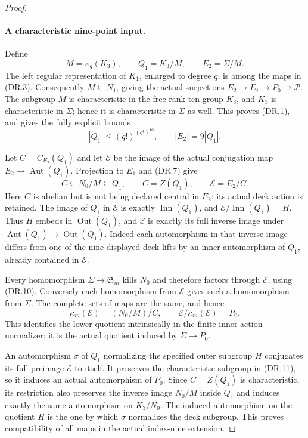 \begin{proof}
\paragraph{A characteristic nine-point input.}
Define
\[
 M=\kappa_q(K_3),\qquad Q_1=K_3/M,
 \qquad E_2=\Sigma/M.                                 \tag{DR.8}
\]
The left regular representation of $K_1$, enlarged to
degree $q$, is among the maps in (DR.3).
Consequently $M\subseteq N_1$, giving the actual
surjections $E_2\to E_1\to P_0\to\mathcal P$.
The subgroup $M$ is characteristic in the free rank-ten
group $K_3$, and $K_3$ is characteristic in $\Sigma$;
hence it is characteristic in $\Sigma$ as well.
This proves (DR.1), and gives the fully explicit bounds
\[
 |Q_1|\leq(q!)^{(q!)^{10}},\qquad
 |E_2|=9|Q_1|.                                        \tag{DR.9}
\]

Let $C=C_{E_2}(Q_1)$ and let $\mathcal E$ be the image
of the actual conjugation map
$E_2\to\operatorname{Aut}(Q_1)$.
Projection to $E_1$ and (DR.7) give
\[
 C\subseteq N_0/M\subseteq Q_1,
 \qquad C=Z(Q_1),\qquad \mathcal E=E_2/C.
                                                        \tag{DR.10}
\]
Here $C$ is abelian but is not being declared central
in $E_2$: its actual deck action is retained.
The image of $Q_1$ in $\mathcal E$ is exactly
$\operatorname{Inn}(Q_1)$, and
$\mathcal E/\operatorname{Inn}(Q_1)=H$.
Thus $H$ embeds in $\operatorname{Out}(Q_1)$, and
$\mathcal E$ is exactly its full inverse image under
$\operatorname{Aut}(Q_1)\to\operatorname{Out}(Q_1)$.
Indeed each automorphism in that inverse image differs
from one of the nine displayed deck lifts by an inner
automorphism of $Q_1$, already contained in $\mathcal E$.

Every homomorphism $\Sigma\to\mathfrak S_m$ kills
$N_0$ and therefore factors through $\mathcal E$,
using (DR.10).  Conversely each homomorphism from
$\mathcal E$ gives such a homomorphism from $\Sigma$.
The complete sets of maps are the same, and hence
\[
 \kappa_m(\mathcal E)=(N_0/M)/C,
 \qquad \mathcal E/\kappa_m(\mathcal E)=P_0.
                                                        \tag{DR.11}
\]
This identifies the lower quotient intrinsically in
the finite inner-action normalizer; it is the actual
quotient induced by $\Sigma\to P_0$.

An automorphism $\sigma$ of $Q_1$ normalizing the
specified outer subgroup $H$ conjugates its full
preimage $\mathcal E$ to itself.
It preserves the characteristic subgroup in (DR.11),
so it induces an actual automorphism of $P_0$.
Since $C=Z(Q_1)$ is characteristic, its restriction
also preserves the inverse image $N_0/M$ inside
$Q_1$ and induces exactly the same automorphism on
$K_3/N_0$.  The induced automorphism on the quotient
$H$ is the one by which $\sigma$ normalizes the deck
subgroup.  This proves compatibility of all maps in
the actual index-nine extension.


\end{proof}
